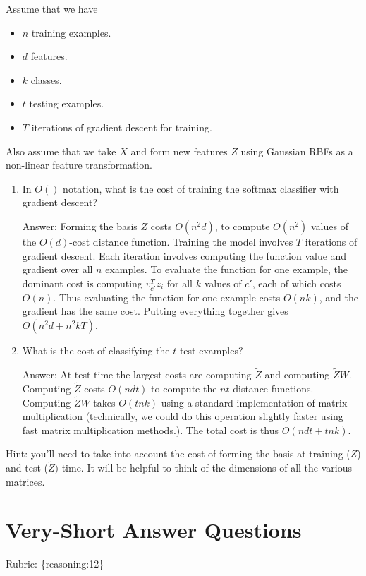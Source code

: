 \documentclass{article}
\def\ans#1{\par\gre{Answer: #1}}
\def\rubric#1{\gre{Rubric: \{#1\}}}{}
\def\blu#1{{\color{blu}#1}}
\def\gre#1{{\color{gre}#1}}
\def\items#1{\begin{itemize}#1\end{itemize}}
\def\enum#1{\begin{enumerate}#1\end{enumerate}}
\begin{document}
Assume that we have
\items{
\item $n$ training examples.
\item $d$ features.
\item $k$ classes.
\item $t$ testing examples.
\item $T$ iterations of gradient descent for training.
}
Also assume that we take $X$ and form new features $Z$ using Gaussian RBFs as a non-linear feature transformation.
\blu{\enum{
\item In $O()$ notation, what is the cost of training the softmax classifier with gradient descent?
\ans{
Forming the basis $Z$ costs $O(n^2d)$, to compute $O(n^2)$ values of the $O(d)$-cost distance function.
Training the model involves $T$ iterations of gradient descent. Each iteration involves computing the function value and gradient over all $n$ examples. To evaluate the function for one example, the dominant cost is computing $v_{c'}^Tz_i$ for all $k$ values of $c'$, each of which costs $O(n)$. Thus evaluating the function for one example costs $O(nk)$, and the gradient has the same cost. Putting everything together gives $O(n^2d + n^2kT)$.}
\item What is the cost of classifying the $t$ test examples?
\ans{At test time the largest costs are computing $\tilde{Z}$ and computing $\tilde{Z}W$. Computing $\tilde{Z}$ costs $O(ndt)$ to compute the $nt$ distance functions. Computing $\tilde{Z}W$ takes $O(tnk)$ using a standard implementation of matrix multiplication (technically, we could do this operation slightly faster using fast matrix multiplication methods.). The total cost is thus $O(ndt + tnk)$.}
}
}
Hint: you'll need to take into account the cost of forming the basis at training ($Z$) and test ($\tilde{Z})$ time. It will be helpful to think of the dimensions of all the various matrices.








\section{Very-Short Answer Questions}
\rubric{reasoning:12}
\end{document}
